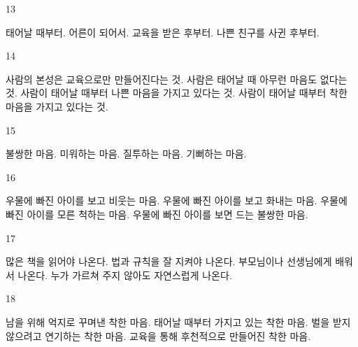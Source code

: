 \documentclass[fs9,seriesFre]{korfarm-base}
\begin{document}
\begin{kfSentenceUnit}{13}{}
\begin{kfChoices}
\kfChoice 태어날 때부터.
\kfChoice 어른이 되어서.
\kfChoice 교육을 받은 후부터.
\kfChoice 나쁜 친구를 사귄 후부터.
\end{kfChoices}
\end{kfSentenceUnit}

\begin{kfSentenceUnit}{14}{}
\begin{kfChoices}
\kfChoice 사람의 본성은 교육으로만 만들어진다는 것.
\kfChoice 사람은 태어날 때 아무런 마음도 없다는 것.
\kfChoice 사람이 태어날 때부터 나쁜 마음을 가지고 있다는 것.
\kfChoice 사람이 태어날 때부터 착한 마음을 가지고 있다는 것.
\end{kfChoices}
\end{kfSentenceUnit}

\begin{kfSentenceUnit}{15}{}
\begin{kfChoices}
\kfChoice 불쌍한 마음.
\kfChoice 미워하는 마음.
\kfChoice 질투하는 마음.
\kfChoice 기뻐하는 마음.
\end{kfChoices}
\end{kfSentenceUnit}

\begin{kfSentenceUnit}{16}{}
\begin{kfChoices}
\kfChoice 우물에 빠진 아이를 보고 비웃는 마음.
\kfChoice 우물에 빠진 아이를 보고 화내는 마음.
\kfChoice 우물에 빠진 아이를 모른 척하는 마음.
\kfChoice 우물에 빠진 아이를 보면 드는 불쌍한 마음.
\end{kfChoices}
\end{kfSentenceUnit}

\begin{kfSentenceUnit}{17}{}
\begin{kfChoices}
\kfChoice 많은 책을 읽어야 나온다.
\kfChoice 법과 규칙을 잘 지켜야 나온다.
\kfChoice 부모님이나 선생님에게 배워서 나온다.
\kfChoice 누가 가르쳐 주지 않아도 자연스럽게 나온다.
\end{kfChoices}
\end{kfSentenceUnit}

\begin{kfSentenceUnit}{18}{}
\begin{kfChoices}
\kfChoice 남을 위해 억지로 꾸며낸 착한 마음.
\kfChoice 태어날 때부터 가지고 있는 착한 마음.
\kfChoice 벌을 받지 않으려고 연기하는 착한 마음.
\kfChoice 교육을 통해 후천적으로 만들어진 착한 마음.
\end{kfChoices}
\end{kfSentenceUnit}
\end{document}
